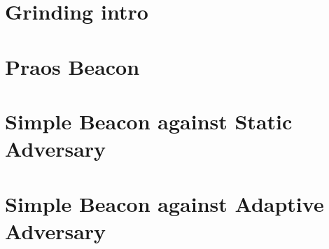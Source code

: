 \chapter{Grinding intro}
\chapter{Praos Beacon}
\chapter{Simple Beacon against Static Adversary}
\chapter{Simple Beacon against Adaptive Adversary}
